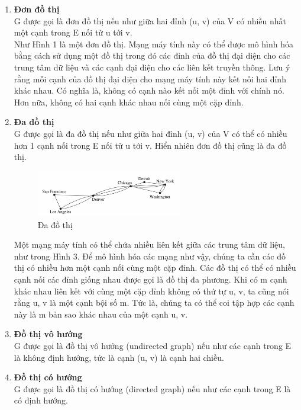 \begin{enumerate}
\item{\textbf{Đơn đồ thị}} \\
    G được gọi là đơn đồ thị nếu như giữa hai đỉnh (u, v) của V có nhiều nhất một cạnh trong E nối từ u tới v.\\
    Như Hình 1 là một đơn đồ thị. Mạng máy tính này có thể được mô hình hóa bằng cách sử dụng một đồ thị trong đó các đỉnh của đồ thị đại diện cho các trung tâm dữ liệu và các cạnh đại diện cho các liên kết truyền thông. Lưu ý rằng mỗi cạnh của đồ thị đại diện cho mạng máy tính này kết nối hai đỉnh khác nhau. Có nghĩa là, không có cạnh nào kết nối một đỉnh với chính nó. Hơn nữa, không có hai cạnh khác nhau nối cùng một cặp đỉnh.
\item{\textbf{Đa đồ thị}} \\
    G được gọi là đa đồ thị nếu như giữa hai đỉnh (u, v) của V có thể có nhiều hơn 1 cạnh nối trong E nối từ u tới v. Hiển nhiên đơn đồ thị cũng là đa đồ thị.
    \begin{figure}[H] %
        \centering %
        \includegraphics[width=0.6\textwidth]{assets/da_dothi.png} 
        \caption{Đa đồ thị} %
        \label{fig:gr_1.1.3}
    \end{figure}
    Một mạng máy tính có thể chứa nhiều liên kết giữa các trung tâm dữ liệu, như trong Hình 3. Để mô hình hóa các mạng như vậy, chúng ta cần các đồ thị có nhiều hơn một cạnh nối cùng một cặp đỉnh. Các đồ thị có thể có nhiều cạnh nối các đỉnh giống nhau được gọi là đồ thị đa phương. Khi có m cạnh khác nhau liên kết với cùng một cặp đỉnh không có thứ tự {u, v}, ta cũng nói rằng {u, v} là một cạnh bội số m. Tức là, chúng ta có thể coi tập hợp các cạnh này là m bản sao khác nhau của một cạnh {u, v}.
\item{\textbf{Đồ thị vô hướng}} \\
    G được gọi là đồ thị vô hướng (undirected graph) nếu như các cạnh trong E là không định hướng, tức là cạnh (u, v) là cạnh hai chiều.\\
\item{\textbf{Đồ thị có hướng}} \\
    G được gọi là đồ thị có hướng (directed graph) nếu như các cạnh trong E là có định hướng.\\

\end{enumerate}
